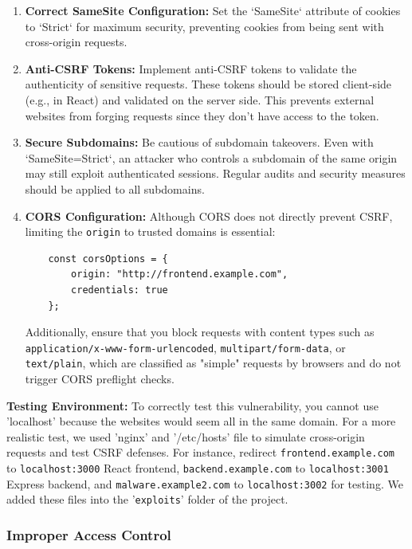 \documentclass[]{article}
\begin{document}
\begin{enumerate}
    \item \textbf{Correct SameSite Configuration:}  
    Set the `SameSite` attribute of cookies to `Strict` for maximum security, preventing cookies from being sent with cross-origin requests.
    
    \item \textbf{Anti-CSRF Tokens:}  
    Implement anti-CSRF tokens to validate the authenticity of sensitive requests. These tokens should be stored client-side (e.g., in React) and validated on the server side. This prevents external websites from forging requests since they don't have access to the token.
    
    \item \textbf{Secure Subdomains:}  
    Be cautious of subdomain takeovers. Even with `SameSite=Strict`, an attacker who controls a subdomain of the same origin may still exploit authenticated sessions. Regular audits and security measures should be applied to all subdomains.
    
    \item \textbf{CORS Configuration:}  
    Although CORS does not directly prevent CSRF, limiting the \texttt{origin} to trusted domains is essential:
    \begin{lstlisting}
    const corsOptions = {
        origin: "http://frontend.example.com",
        credentials: true
    };
    \end{lstlisting}
    Additionally, ensure that you block requests with content types such as \texttt{application/x-www-form-urlencoded}, \texttt{multipart/form-data}, or \texttt{text/plain}, which are classified as "simple" requests by browsers and do not trigger CORS preflight checks.
\end{enumerate}
\textbf{Testing Environment:}
   To correctly test this vulnerability, you cannot use 'localhost' because the websites would seem all in the same domain. For a more realistic test, we used 'nginx' and '/etc/hosts' file to simulate cross-origin requests and test CSRF defenses. For instance, redirect \texttt{frontend.example.com} to \texttt{localhost:3000} React frontend, \texttt{backend.example.com} to \texttt{localhost:3001} Express backend, and \texttt{malware.example2.com} to \texttt{localhost:3002} for testing. We added these files into the '\texttt{exploits}' folder of the project.


\subsubsection{Improper Access Control}
\label{subsubsec:improper_access_control}
\end{document}
